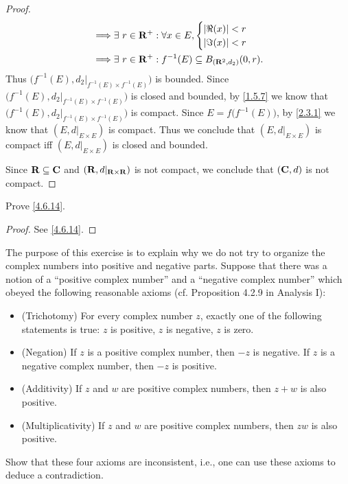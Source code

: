 \begin{proof}
\begin{align*}
    \implies & \exists\ r \in \mathbf{R}^+ : \forall x \in E, \begin{cases}
                                                        \left\lvert\Re(x)\right\rvert < r \\
                                                        \left\lvert\Im(x)\right\rvert < r
                                                      \end{cases}                                                               \\
    \implies & \exists\ r \in \mathbf{R}^+ : f^{-1}(E) \subseteq B_{(\mathbf{R}^2, d_2)}(0, r).
  \end{align*}
  Thus \(\big(f^{-1}(E), d_2|_{f^{-1}(E) \times f^{-1}(E)}\big)\) is bounded.
  Since \(\big(f^{-1}(E), d_2|_{f^{-1}(E) \times f^{-1}(E)}\big)\) is closed and bounded, by \cref{1.5.7} we know that \(\big(f^{-1}(E), d_2|_{f^{-1}(E) \times f^{-1}(E)}\big)\) is compact.
  Since \(E = f\big(f^{-1}(E)\big)\), by \cref{2.3.1} we know that \((E, d|_{E \times E})\) is compact.
  Thus we conclude that \((E, d|_{E \times E})\) is compact iff \((E, d|_{E \times E})\) is closed and bounded.

  Since \(\mathbf{R} \subseteq \mathbf{C}\) and \((\mathbf{R}, d|_{\mathbf{R} \times \mathbf{R}})\) is not compact, we conclude that \((\mathbf{C}, d)\) is not compact.
\end{proof}

\begin{exercise}\label{ex 4.6.14}
  Prove \cref{4.6.14}.
\end{exercise}

\begin{proof}
  See \cref{4.6.14}.
\end{proof}

\begin{exercise}\label{ex 4.6.15}
  The purpose of this exercise is to explain why we do not try to organize the complex numbers into positive and negative parts.
  Suppose that there was a notion of a ``positive complex number'' and a ``negative complex number'' which obeyed the following reasonable axioms (cf. Proposition 4.2.9 in Analysis I):
  \begin{itemize}
    \item (Trichotomy)
          For every complex number \(z\), exactly one of the following statements is true:
          \(z\) is positive, \(z\) is negative, \(z\) is zero.
    \item (Negation)
          If \(z\) is a positive complex number, then \(-z\) is negative.
          If \(z\) is a negative complex number, then \(-z\) is positive.
    \item (Additivity)
          If \(z\) and \(w\) are positive complex numbers, then \(z + w\) is also positive.
    \item (Multiplicativity)
          If \(z\) and \(w\) are positive complex numbers, then \(zw\) is also positive.
  \end{itemize}
  Show that these four axioms are inconsistent, i.e., one can use these axioms to deduce a contradiction.
\end{exercise}

